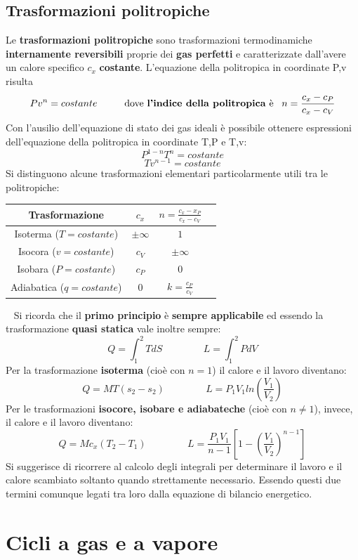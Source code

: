 \subsection{Trasformazioni politropiche}
Le \textbf{trasformazioni politropiche} sono trasformazioni termodinamiche \textbf{internamente reversibili}
proprie dei \textbf{gas perfetti} e caratterizzate dall’avere un calore specifico $c_x$ \textbf{costante}.\newline
\newline
L’equazione della politropica in coordinate P,v risulta
\[
    Pv^n = costante \;\;\;\;\;\;\;\;\;\;\text{dove \textbf{l'indice della politropica} è}\;\;\;n = \frac{c_x - c_P}{c_x - c_V}
\]
Con l’ausilio dell’equazione di stato dei gas ideali è possibile ottenere espressioni
dell’equazione della politropica in coordinate T,P e T,v: 
\[
    P^{1-n}T^n = costante
\]
\[
    Tv^{n-1} = costante
\]
Si distinguono alcune trasformazioni elementari particolarmente utili tra le politropiche: 
\begin{center}
    \begin{tabular}{ |c|c|c|c| } 
        \hline
        Trasformazione & $c_x$ & $n = \frac{c_x - x_P}{c_x - c_V}$ \\
        \hline
        Isoterma ($T = costante$) & $\pm \infty$ & $1$ \\ 
        Isocora ($v = costante$) & $c_V$ & $\pm \infty$\\ 
        Isobara ($P = costante$) & $c_P$ & $0$\\ 
        Adiabatica ($q = costante$) & $0$ & $k= \frac{c_P}{c_V}$\\ 
        \hline
    \end{tabular}
\end{center}
\ \newline
Si ricorda che il \textbf{primo principio} è \textbf{sempre applicabile} ed essendo la trasformazione \textbf{quasi statica} vale inoltre sempre:
\[
    Q = \int_{1}^{2}TdS \;\;\;\;\;\;\;\;\;\;\;\;\;\;\;L=\int_{1}^{2}PdV
\]
Per la trasformazione \textbf{isoterma} (cioè con $n = 1$) il calore e il lavoro diventano:
\[
    Q = MT(s_2-s_2) \;\;\;\;\;\;\;\;\;\;\;\;\;\;\; L = P_1V_1 ln \left(\frac{V_1}{V_2}\right)
\]
Per le trasformazioni \textbf{isocore, isobare e adiabateche} (cioè con $n \neq 1$), invece, il calore e il lavoro diventano:
\[
    Q= Mc_x (T_2-T_1) \;\;\;\;\;\;\;\;\;\;\;\;\;\;\; L = \frac{P_1V_1}{n-1}\left[ 1 - \left(\frac{V_1}{V_2}\right)^{n-1}\right]
\]
Si suggerisce di ricorrere al calcolo degli integrali per determinare il lavoro e il calore
scambiato soltanto quando strettamente necessario. Essendo questi due termini comunque
legati tra loro dalla equazione di bilancio energetico. 
\section{Cicli a gas e a vapore}